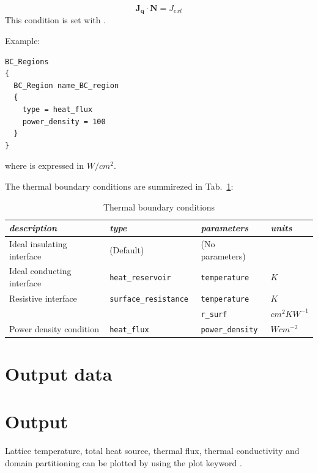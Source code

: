 \begin{equation}\label{TH}
\mathbf{J_q}\cdot \mathbf{N} = J_{ext}
\end{equation}
This condition is set with .

Example:
\begin{verbatim}
BC_Regions
{
  BC_Region name_BC_region
  {
    type = heat_flux
    power_density = 100 
  }
}
\end{verbatim}
where  is expressed in $W/cm^2$.

The thermal boundary conditions are summirezed in Tab.~\ref{table:tbc}:

\begin{table}[htbp]
\center
\begin{tabular}{l||l||l||l}
\textit{description} & \textit{type} & \textit{parameters} & \textit{units}\\
\hline\hline
Ideal insulating interface & (Default) & (No parameters) &   \\
Ideal conducting interface & \texttt{heat\_reservoir} & \texttt{temperature} & $K$\\
Resistive interface &\texttt{surface\_resistance } & \texttt{temperature} & $K$ \\
 & & \texttt{r\_surf} & $cm^2 K W^{-1}$\\
Power density condition& \texttt{heat\_flux} & \texttt{power\_density} & $Wcm^{-2}$
\end{tabular}
\caption{Thermal boundary conditions}
\label{table:tbc}
\end{table}
\section{Output data}
 

\section{Output}

Lattice temperature, total heat source, thermal flux, thermal conductivity and domain partitioning can be plotted by using the plot keyword .
